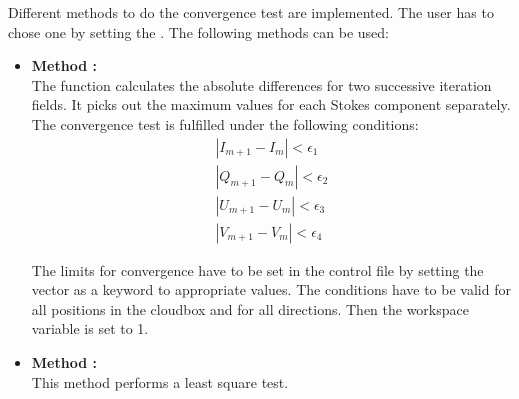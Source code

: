 \label{sec:scattering:conv_method}

Different methods to do the convergence test are implemented. The user
has to chose one by setting the
. The following methods can be
used:

\begin{itemize}
\item {\bf Method :}\\
The function calculates the absolute differences for two successive
iteration fields. It picks out the maximum values for each Stokes 
component separately. The convergence test is fulfilled under the
following conditions:
\begin{eqnarray}
|I_{m+1} - I_m| < \epsilon_1    \\
|Q_{m+1} - Q_m| < \epsilon_2    \\
|U_{m+1} - U_m| < \epsilon_3    \\
|V_{m+1} - V_m| < \epsilon_4     
\end{eqnarray}

The limits for convergence have to be set in the control file by 
setting the vector  as a keyword 
to appropriate values.
The conditions have to be valid for all positions in the cloudbox 
and for all directions.
Then the workspace variable  is set to 1.

\item {\bf Method :}\\
This method performs a least square test.
\end{itemize}



 



